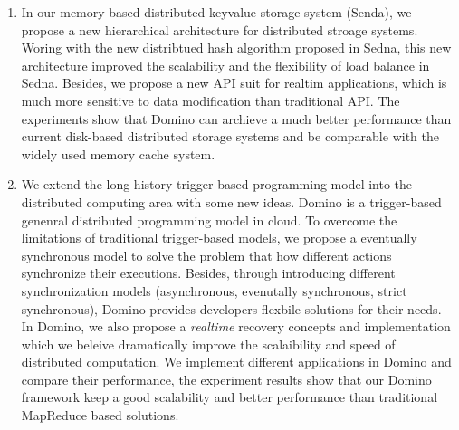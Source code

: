 \begin{eabstract}
\begin{enumerate}
  \item In our memory based distributed keyvalue storage system (Senda), we propose a new hierarchical architecture for distributed stroage systems. Woring with the new distribtued hash algorithm proposed in Sedna, this new architecture improved the scalability and the flexibility of load balance in Sedna. Besides, we propose a new API suit for realtim applications, which is much more sensitive to data modification than traditional API. The experiments show that Domino can archieve a much better performance than current disk-based distributed storage systems and be comparable with the widely used memory cache system.

  \item We extend the long history trigger-based programming model into the distributed computing area with some new ideas. Domino is a trigger-based genenral distributed programming model in cloud. To overcome the limitations of traditional trigger-based models, we propose a eventually synchronous model to solve the problem that how different actions synchronize their executions. Besides, through introducing different synchronization models (asynchronous, evenutally synchronous, strict synchronous), Domino provides developers flexbile solutions for their needs. In Domino, we also propose a \textit{realtime} recovery concepts and implementation which we beleive dramatically improve the scalaibility and speed of distributed computation. We implement different applications in Domino and compare their performance, the experiment results show that our Domino framework keep a good scalability and better performance than traditional MapReduce based solutions.

\end{enumerate}

\end{eabstract}
